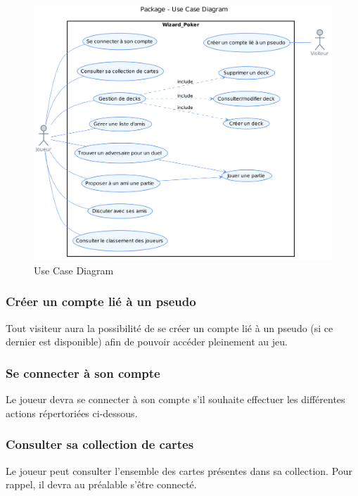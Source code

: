 \documentclass[11pt,a4paper]{article}
\begin{document}
\label{sec:exi-fonc}
\begin{figure}[ht]
  \centering
  \includegraphics[width=1\textwidth]{../uml_files/UseCaseDiagram.png}
  \caption{\label{fig:usecasebesoin} Use Case Diagram}
\end{figure}

\subsubsection*{Créer un compte lié à un pseudo}

Tout visiteur aura la possibilité de se créer un compte
lié à un pseudo (si ce dernier est disponible) afin de pouvoir
accéder pleinement au jeu.


\subsubsection*{Se connecter à son compte}

Le joueur devra se connecter à son compte s'il souhaite effectuer
les différentes actions répertoriées ci-dessous.


\subsubsection*{Consulter sa collection de cartes}

Le joueur peut consulter l'ensemble des cartes présentes dans sa
collection. Pour rappel, il devra au préalable s'être connecté.
\end{document}
